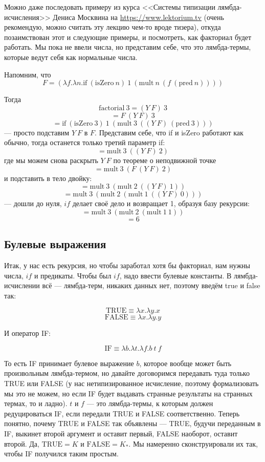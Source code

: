 \documentclass[a5paper]{article}
\begin{document}
Можно даже последовать примеру из курса <<Системы типизации лямбда-исчисления>> Дениса Москвина на \url{https://www.lektorium.tv} (очень рекомендую, можно считать эту лекцию чем-то вроде тизера), откуда позаимствован этот и следующие примеры, и посмотреть, как факториал будет работать. Мы пока не ввели числа, но представим себе, что это лямбда-термы, которые ведут себя как нормальные числа.

Напомним, что
$$F = (\lambda f.\lambda n.\mbox{if}\ (\mbox{isZero}\ n)\ 1\ (\mbox{mult}\ n\ (f\ (\mbox{pred}\ n))))$$

Тогда
$$\mbox{factorial}\ 3 = (Y\ F)\ 3$$
$$= F\ (Y\ F)\ 3$$
$$= \mbox{if}\ (\mbox{isZero}\ 3)\ 1\ (\mbox{mult}\ 3\ ((Y\ F)\ (\mbox{pred}\ 3)))$$
--- просто подставим $Y\ F$ в $F$. Представим себе, что if и isZero работают как обычно, тогда останется только третий параметр if:
$$= \mbox{mult}\ 3\ ((Y\ F)\ 2)$$
где мы можем снова раскрыть $Y\ F$ по теореме о неподвижной точке
$$= \mbox{mult}\ 3\ (F\ (Y\ F)\ 2)$$
и подставить в тело двойку:
$$= \mbox{mult}\ 3\ (\mbox{mult}\ 2\ ((Y\ F)\ 1))$$
$$= \mbox{mult}\ 3\ (\mbox{mult}\ 2\ (\mbox{mult}\ 1\ ((Y\ F)\ 0)))$$
--- дошли до нуля, $if$ делает своё дело и возвращает 1, образуя базу рекурсии:
$$= \mbox{mult}\ 3\ (\mbox{mult}\ 2\ (\mbox{mult}\ 1\ 1))$$
$$= 6$$

\subsection{Булевые выражения}

Итак, у нас есть рекурсия, но чтобы заработал хотя бы факториал, нам нужны числа, $if$ и предикаты. Чтобы был $if$, надо ввести булевые константы. В лямбда-исчислении всё --- лямбда-терм, никаких данных нет, поэтому введём true и false так:

$$\mbox{TRUE} \equiv \lambda x.\lambda y.x$$
$$\mbox{FALSE} \equiv \lambda x.\lambda y.y$$

И оператор IF: 

$$\mbox{IF} \equiv \lambda b.\lambda t.\lambda f.b\ t\ f$$

То есть IF принимает булевое выражение $b$, которое вообще может быть произвольным лямбда-термом, но давайте договоримся передавать туда только TRUE или FALSE (у нас нетипизированное исчисление, поэтому формализовать мы это не можем, но если IF будет выдавать странные результаты на странных термах, то и ладно). $t$ и $f$ --- это лямбда-термы, к которым должен редуцироваться IF, если передали TRUE и FALSE соответственно. Теперь понятно, почему TRUE и FALSE так объявлены --- TRUE, будучи переданным в IF, выкинет второй аргумент и оставит первый, FALSE наоборот, оставит второй. Да, $\mbox{TRUE} = K$ и $\mbox{FALSE} = K_\ast$. Мы намеренно сконструировали их так, чтобы IF получился таким простым.
\end{document}
